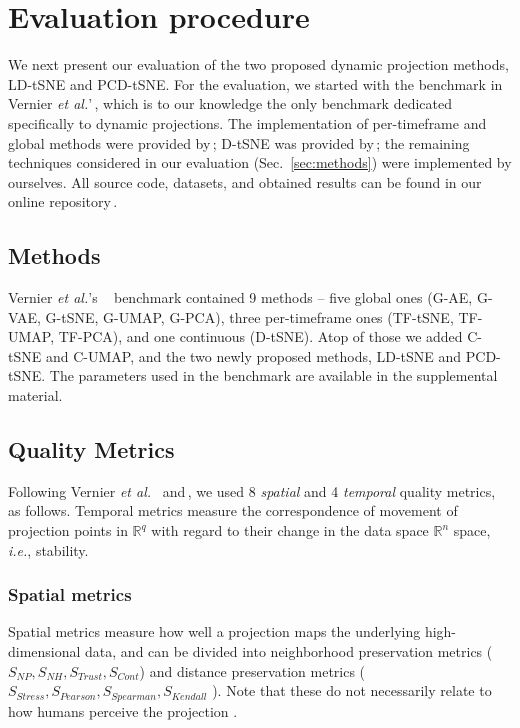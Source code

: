 \section{Evaluation procedure} 
\label{sec:experimental-setup}
%
We next present our evaluation of the two proposed dynamic projection methods, LD-tSNE and PCD-tSNE. For the evaluation, we started with the benchmark in Vernier \emph{et al.}'\,\cite{Vernier2020}, which is to our knowledge the only benchmark dedicated specifically to dynamic projections. The implementation of per-timeframe and global methods were provided by\,\cite{Vernier2020}; D-tSNE was provided by\,\cite{Rauber2016};  the remaining techniques considered in our evaluation (Sec.~\ref{sec:methods}) were implemented by ourselves. All source code, datasets, and obtained results can be found in our online repository\,\cite{repo-guided}. 

\subsection{Methods}
\label{sec:eval-methods}

Vernier \emph{et al.}'s ~\cite{Vernier2020} benchmark contained 9 methods -- five global ones (G-AE, G-VAE, G-tSNE, G-UMAP, G-PCA), three per-timeframe ones (TF-tSNE, TF-UMAP, TF-PCA), and one continuous (D-tSNE). 
Atop of those we added C-tSNE and C-UMAP, and the two newly proposed methods, LD-tSNE and PCD-tSNE. The parameters used in the benchmark are available in the supplemental material.

\subsection{Quality Metrics}
\label{sec:metrics}
%
Following Vernier \emph{et al.}~\cite{Vernier2020} and\,\cite{Espadoto2019}, we used 8 \emph{spatial} and 4 \emph{temporal} quality metrics, as follows. Temporal metrics measure the correspondence of movement of projection points in $\mathbb{R}^q$ with regard to their change in the data space $\mathbb{R}^n$ space, \emph{i.e.}, stability. 

\subsubsection{Spatial metrics}
\label{sec:spatial}

Spatial metrics measure how well a projection maps the underlying high-dimensional data, and can be divided into neighborhood preservation metrics ($S_{NP}, S_{NH}, S_{Trust}, S_{Cont}$) and distance preservation metrics ($S_{Stress}, S_{Pearson}, S_{Spearman}, S_{Kendall}$ ). Note that these do not necessarily relate to how humans perceive the projection \cite{Wang2018}.


